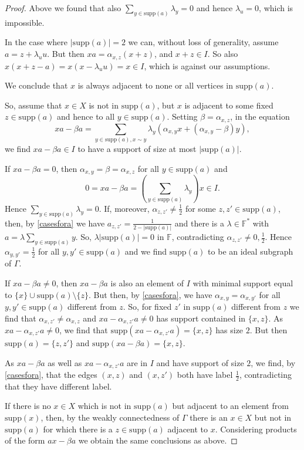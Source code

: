 \documentclass[oneside,a4paper]{amsart} %
\theoremstyle{definition}
\begin{document}
\begin{proof}
Above we found that also $\displaystyle\sum_{y\in \mathrm{supp}(a)} \lambda_y=0$
and hence $\lambda_u=0$, which is impossible.


In the case where $|\mathrm{supp}(a)|=2$ we can, without loss of generality, assume $a=z+\lambda_u u$.
But then $xa= \alpha_{x,z}(x+z)$, and $x+z\in I$.
So also $x(x+z-a)= x(x-\lambda_u u)=x\in I$, which is against our assumptions.

We conclude that $x$ is always adjacent to none or all vertices in $\mathrm{supp}(a)$. 



So, assume that $x\in X$ is not in $\mathrm{supp}(a)$, but $x$ is adjacent to some fixed $z\in\mathrm{supp}(a)$
and hence to all $y\in \mathrm{supp}(a)$.
Setting  $\beta=\alpha_{x,z}$,  in the equation
$$ xa-\beta a=\displaystyle\sum_{y\in \mathrm{supp}(a),x\sim y} \lambda_y(\alpha_{x,y} x +(\alpha_{x,y}-\beta) y),$$ 
we find $xa-\beta a\in I$ to have a support of size at most 
$|\mathrm{supp}(a)|$.

If $xa-\beta a=0$, then $\alpha_{x,y}=\beta=\alpha_{x,z}$ for all $y\in \mathrm{supp}(a)$
and $$0=xa-\beta a=(\displaystyle\sum_{y\in \mathrm{supp}(a)}\lambda_y) x\in I.$$
Hence $\displaystyle\sum_{y\in \mathrm{supp}(a)}\lambda_y=0$.
If, moreover, $\alpha_{z,z'}\neq \frac{1}{2}$ for some $z,z'\in \mathrm{supp}(a)$, then, by \cref{casesfora} we have $a_{z,z'}=\frac{1}{2-|\mathrm{supp}(a)|}$ and 
there is a $\lambda\in \mathbb{F}^*$ with $a=\lambda \displaystyle\sum_{y\in \mathrm{supp}(a)} y$.
So, $\lambda |\mathrm{supp}(a)|=0$ in $\mathbb{F}$, contradicting $\alpha_{z,z'}\neq 0, \frac{1}{2}$.
Hence $\alpha_{y,y'}=\frac{1}{2}$ for all $y,y'\in \mathrm{supp}(a)$ and we find $\mathrm{supp}(a)$ to be an ideal subgraph of $\Gamma$.


If $xa-\beta a\neq 0$, then $xa-\beta a$ is also an element of $I$ with minimal support equal to $\{x\}\cup \mathrm{supp}(a)\setminus \{z\}$.
But then, by \cref{casesfora}, we have  $\alpha_{x,y}=\alpha_{x,y'}$ for all $y,y'\in \mathrm{supp}(a)$ different from $z$. 
So, for fixed $z'$ in $\mathrm{supp}(a)$ different from $z$ we find that $\alpha_{x,z'}\neq \alpha_{x,z}$ and   $xa-\alpha_{x,z'}a\neq 0$ has support contained in $\{x,z\}$.
As $xa-\alpha_{x,z'}a\neq 0$, we find that $\mathrm{supp}(xa-\alpha_{x,z'}a)=\{x,z\}$ has size $2$. But then $\mathrm{supp}(a)=\{z,z'\}$ and 
$\mathrm{supp}(xa-\beta a)=\{x,z\}$.

As $xa-\beta a$ as well as $xa-\alpha_{x,z'}a$ are in $I$ and have support of size $2$, we find, by \cref{casesfora}, that the edges $(x,z)$ and $(x,z')$ both have label $\frac{1}{2}$, contradicting that they have different label.

If there is no $x\in X$  which is not in $\mathrm{supp}(a)$ but  adjacent to an element from $\mathrm{supp}(x)$, then, by the weakly connectedness
of $\Gamma$ there is an $x\in X$ but not in $\mathrm{supp}(a)$ for which there is a $z\in \mathrm{supp}(a)$ adjacent to $x$.
Considering products of the form $ax-\beta a$ we obtain the same conclusions as above.
\end{proof}
\end{document}
